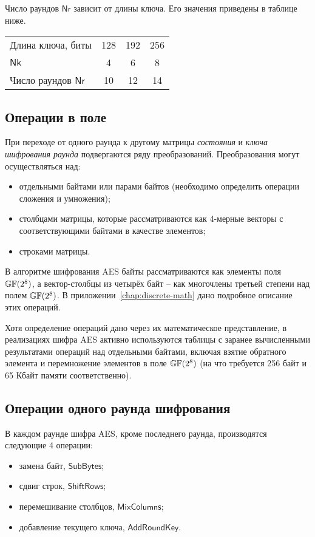 Число раундов $\mathsf{Nr}$ зависит от длины ключа. Его значения приведены в таблице ниже.

\begin{center}
    \begin{tabular}{|l|c|c|c|}
    \hline
    Длина ключа, биты           &128 & 192 & 256 \\
    $\mathsf{Nk}$               & 4  & 6   & 8 \\
    Число раундов $\mathsf{Nr}$ & 10 & 12 & 14 \\
    \hline
    \end{tabular}
\end{center}


\subsection{Операции в поле}

При переходе от одного раунда к другому матрицы \textit{состояния} и \textit{ключа шифрования раунда} подвергаются ряду преобразований. Преобразования могут осуществляться над:
\begin{itemize}
    \item отдельными байтами или парами байтов (необходимо определить операции сложения и умножения);
    \item столбцами матрицы, которые рассматриваются как 4-мерные векторы с соответствующими байтами в качестве элементов;
    \item строками матрицы.
\end{itemize}

В алгоритме шифрования AES байты рассматриваются как элементы поля $\mathbb{GF}(2^8)$, а вектор-столбцы из четырёх байт -- как многочлены третьей степени над полем $\mathbb{GF}(2^8)$. В приложении~\ref{chap:discrete-math} дано подробное описание этих операций.

Хотя определение операций дано через их математическое представление, в реализациях шифра AES активно используются таблицы с заранее вычисленными результатами операций над отдельными байтами, включая взятие обратного элемента и перемножение элементов в поле $\mathbb{GF}(2^8)$ (на что требуется 256 байт и 65 Кбайт памяти соответственно).

\subsection{Операции одного раунда шифрования}

В каждом раунде шифра AES, кроме последнего раунда, производятся следующие 4 операции:
\begin{itemize}
  \item замена байт, $\mathsf{SubBytes}$;
  \item сдвиг строк, $\mathsf{ShiftRows}$;
  \item перемешивание столбцов, $\mathsf{MixColumns}$;
  \item добавление текущего ключа, $\mathsf{AddRoundKey}$.
\end{itemize}

